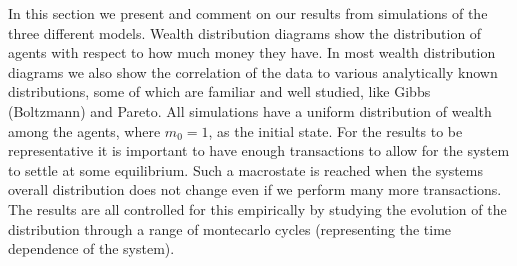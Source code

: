 In this section we present and comment on our results from simulations of the three different models. Wealth distribution diagrams show the distribution of agents with respect to how much money they have. In most wealth distribution diagrams we also show the correlation of the data to various analytically known distributions, some of which are familiar and well studied, like Gibbs (Boltzmann) and Pareto. 
All simulations have a uniform distribution of wealth among the agents, where $m_0 = 1$, as the initial state.
For the results to be representative it is important to have enough transactions to allow for the system to settle at some equilibrium. Such a macrostate is reached when the systems overall distribution does not change even if we perform many more transactions. The results are all controlled for this empirically by studying the evolution of the distribution through a range of montecarlo cycles (representing the time dependence of the system).


